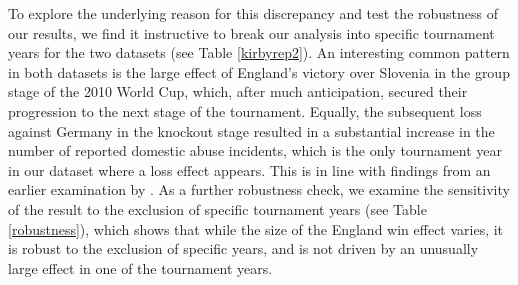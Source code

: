 \documentclass[12pt, a4paper]{article}
\begin{document}
To explore the underlying reason for this discrepancy and test the robustness of our results, we find it instructive to break our analysis into specific tournament years for the two datasets (see Table \ref{kirbyrep2}). An interesting common pattern in both datasets is the large effect of England's victory over Slovenia in the group stage of the 2010 World Cup, which, after much anticipation, secured their progression to the next stage of the tournament. Equally, the subsequent loss against Germany in the knockout stage resulted in a substantial increase in the number of reported domestic abuse incidents, which is the only tournament year in our dataset where a loss effect appears. This is in line with findings from an earlier examination by . As a further robustness check, we examine the sensitivity of the result to the exclusion of specific tournament years  (see Table \ref{robustness}), which shows that while the size of the England win effect varies, it is robust to the exclusion of specific years, and is not driven by an unusually large effect in one of the tournament years.

\end{document}
